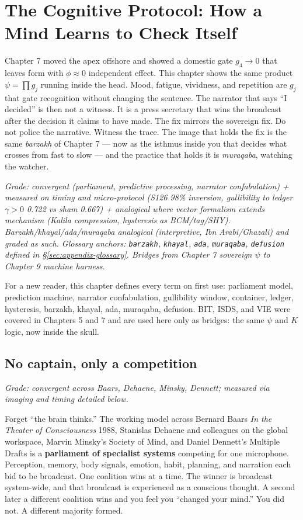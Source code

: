 \chapter{The Cognitive Protocol: How a Mind Learns to Check Itself}
\label{ch:cognitive}

Chapter 7 moved the apex offshore and showed a domestic gate $g_4 \to 0$ that leaves form with $\phi \approx 0$ independent effect. This chapter shows the same product $\psi = \prod g_j$ running inside the head. Mood, fatigue, vividness, and repetition are $g_j$ that gate recognition without changing the sentence. The narrator that says ``I decided'' is then not a witness. It is a press secretary that wins the broadcast after the decision it claims to have made. The fix mirrors the sovereign fix. Do not police the narrative. Witness the trace. The image that holds the fix is the same \textit{barzakh} of Chapter 7 --- now as the isthmus inside you that decides what crosses from fast to slow --- and the practice that holds it is \textit{muraqaba}, watching the watcher.

\textit{Grade: convergent (parliament, predictive processing, narrator confabulation) + measured on timing and micro-protocol (S126 98\% inversion, gullibility to ledger $\gamma>0$ 0.722 vs sham 0.667) + analogical where vector formalism extends mechanism (Kalila compression, hysteresis as BCM/tag/SHY). Barzakh/khayal/ada/muraqaba analogical (interpretive, Ibn Arabi/Ghazali) and graded as such. Glossary anchors: \texttt{barzakh}, \texttt{khayal}, \texttt{ada}, \texttt{muraqaba}, \texttt{defusion} defined in \S\ref{sec:appendix-glossary}. Bridges from Chapter 7 sovereign $\psi$ to Chapter 9 machine harness.}

For a new reader, this chapter defines every term on first use: parliament model, prediction machine, narrator confabulation, gullibility window, container, ledger, hysteresis, barzakh, khayal, ada, muraqaba, defusion. BIT, ISDS, and VIE were covered in Chapters 5 and 7 and are used here only as bridges: the same $\psi$ and $K$ logic, now inside the skull.

\section{No captain, only a competition}

\textit{Grade: convergent across Baars, Dehaene, Minsky, Dennett; measured via imaging and timing detailed below.}

Forget ``the brain thinks.'' The working model across Bernard Baars \textit{In the Theater of Consciousness} 1988, Stanislas Dehaene and colleagues on the global workspace, Marvin Minsky's Society of Mind, and Daniel Dennett's Multiple Drafts is a \textbf{parliament of specialist systems} competing for one microphone. Perception, memory, body signals, emotion, habit, planning, and narration each bid to be broadcast. One coalition wins at a time. The winner is broadcast system-wide, and that broadcast is experienced as a conscious thought. A second later a different coalition wins and you feel you ``changed your mind.'' You did not. A different majority formed.

